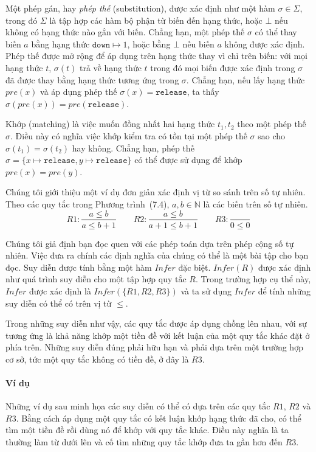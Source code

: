 Một phép gán, hay \emph{phép thế} (substitution), được xác định như một hàm $\sigma\in\Sigma$, trong đó $\Sigma$ là tập hợp các hàm bộ phận từ biến đến hạng thức, hoặc $\bot$ nếu không có hạng thức nào gắn với biến. Chẳng hạn, một phép thế $\sigma$ có thể thay biến $a$ bằng hạng thức $\texttt{down}\mapsto1$, hoặc bằng $\bot$ nếu biến $a$ không được xác định. Phép thế được mở rộng để áp dụng trên hạng thức thay vì chỉ trên biến: với mọi hạng thức $t$, $\sigma(t)$ trả về hạng thức $t$ trong đó mọi biến được xác định trong $\sigma$ đã được thay bằng hạng thức tương ứng trong $\sigma$. Chẳng hạn, nếu lấy hạng thức $pre(x)$ và áp dụng phép thế $\sigma(x)=\texttt{release}$, ta thấy $\sigma(pre(x))=pre(\texttt{release})$.

Khớp (matching) là việc muốn đồng nhất hai hạng thức $t_1,t_2$ theo một phép thế $\sigma$. Điều này có nghĩa việc khớp kiểm tra có tồn tại một phép thế $\sigma$ sao cho $\sigma(t_1)=\sigma(t_2)$ hay không. Chẳng hạn, phép thế $\sigma=\{x\mapsto\texttt{release},y\mapsto\texttt{release}\}$ có thể được sử dụng để khớp $pre(x)=pre(y)$.

Chúng tôi giới thiệu một ví dụ đơn giản xác định vị từ so sánh trên số tự nhiên. Theo các quy tắc trong Phương trình~(7.4), $a,b\in\mathbb{N}$ là các biến trên số tự nhiên.
\begin{equation}
R1:\frac{a\leqslant b}{a\leqslant b+1}\qquad
R2:\frac{a\leqslant b}{a+1\leqslant b+1}\qquad
R3:\frac{}{0\leqslant0}\tag{7.4}
\end{equation}

Chúng tôi giả định bạn đọc quen với các phép toán dựa trên phép cộng số tự nhiên. Việc đưa ra chính các định nghĩa của chúng có thể là một bài tập cho bạn đọc. Suy diễn được tính bằng một hàm $Infer$ đặc biệt. $Infer(R)$ được xác định như quá trình suy diễn cho một tập hợp quy tắc $R$. Trong trường hợp cụ thể này, $Infer$ được xác định là $Infer(\{R1,R2,R3\})$ và ta sử dụng $Infer$ để tính những suy diễn có thể có trên vị từ $\leqslant$.

Trong những suy diễn như vậy, các quy tắc được áp dụng chồng lên nhau, với sự tương ứng là khả năng khớp một tiền đề với kết luận của một quy tắc khác đặt ở phía trên. Những suy diễn đúng phải hữu hạn và phải dựa trên một trường hợp cơ sở, tức một quy tắc không có tiền đề, ở đây là $R3$.

\paragraph{Ví dụ}
Những ví dụ sau minh họa các suy diễn có thể có dựa trên các quy tắc $R1$, $R2$ và $R3$. Bằng cách áp dụng một quy tắc có kết luận khớp hạng thức đã cho, có thể tìm một tiền đề rồi dùng nó để khớp với quy tắc khác. Điều này nghĩa là ta thường làm từ dưới lên và cố tìm những quy tắc khớp đưa ta gần hơn đến $R3$.

